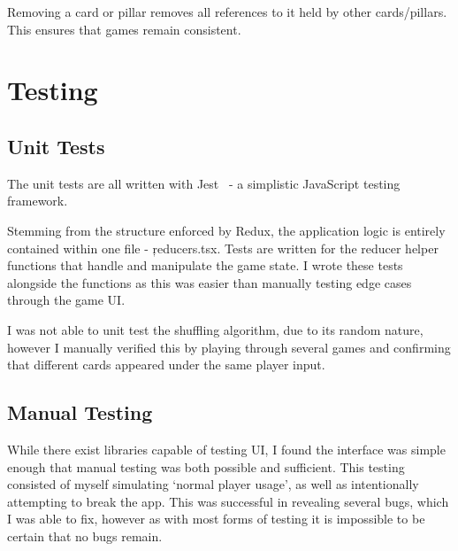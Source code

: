 Removing a card or pillar removes all references to it held by other cards/pillars. This ensures that games remain consistent.

\section{Testing}
\subsection{Unit Tests}
The unit tests are all written with Jest~\cite{Jest} - a simplistic JavaScript testing framework.

Stemming from the structure enforced by Redux, the application logic is entirely contained within one file - \c{reducers.tsx}. Tests are written for the reducer helper functions that handle and manipulate the game state. 
I wrote these tests alongside the functions as this was easier than manually testing edge cases through the game UI. 

I was not able to unit test the shuffling algorithm, due to its random nature, however I manually verified this by playing through several games and confirming that different cards appeared under the same player input.

\subsection{Manual Testing}
While there exist libraries capable of testing UI, I found the \od{} interface was simple enough that manual testing was both possible and sufficient. This testing consisted of myself simulating `normal player usage', as well as intentionally attempting to break the app. This was successful in revealing several bugs, which I was able to fix, however as with most forms of testing it is impossible to be certain that no bugs remain.

